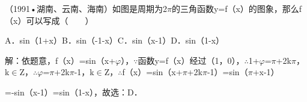 \begin{question}
（1991•湖南、云南、海南）如图是周期为2\ensuremath{\pi}的三角函数y=f（x）的图象，那么f（x）可以写成（　　）\par
{}\par
A．sin（1+x）\qquad{}B．sin（-1-x）\qquad{}C．sin（x-1）\qquad{}D．sin（1-x）\par
\begin{solution}
解：依题意，f（x）=sin（x+\ensuremath{\varphi}），\ensuremath{\because}函数y=f（x）经过（1，0），\ensuremath{\therefore}1+\ensuremath{\varphi}=\ensuremath{\pi}+2k\ensuremath{\pi}，k\ensuremath{\in}Z，\ensuremath{\therefore}\ensuremath{\varphi}=\ensuremath{\pi}+2k\ensuremath{\pi}-1，k\ensuremath{\in}Z，\ensuremath{\therefore}f（x）=sin（x+\ensuremath{\pi}+2k\ensuremath{\pi}-1）=sin（\ensuremath{\pi}+x-1）\par
=-sin（x-1）=sin（1-x），故选：D．\par
\end{solution}
\end{question}

